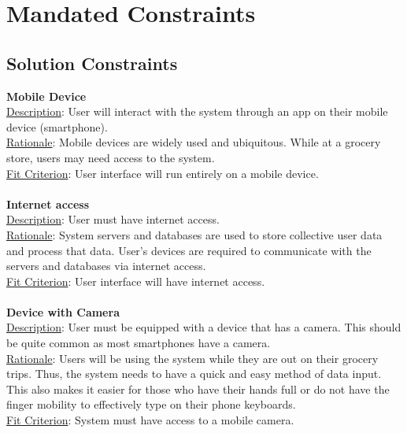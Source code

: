 \documentclass[12pt]{article}
\begin{document}
\section{Mandated Constraints}
\subsection{Solution Constraints}
\textbf{Mobile Device}\\
\underline{Description}: User will interact with the system through an app on their mobile device (smartphone).\\
\underline{Rationale}: Mobile devices are widely used and ubiquitous. While at a grocery store, users may need access to the system.\\
\underline{Fit Criterion}: User interface will run entirely on a mobile device.\\
\\
\textbf{Internet access}\\ %
\underline{Description}: User must have internet access.\\
\underline{Rationale}: System servers and databases are used to store collective user data and process that data. User's devices are required to communicate with the servers and databases via internet access.\\
\underline{Fit Criterion}: User interface will have internet access.\\
\\
\textbf{Device with Camera}\\
\underline{Description}: User must be equipped with a device that has a camera. This should be quite common as most smartphones have a camera.\\
\underline{Rationale}: Users will be using the system while they are out on their grocery trips. Thus, the system needs to have a quick and easy method of data input. This also makes it easier for those who have their hands full or do not have the finger mobility to effectively type on their phone keyboards.\\
\underline{Fit Criterion}: System must have access to a mobile camera.\\
\end{document}
